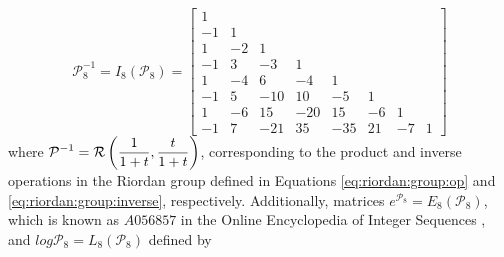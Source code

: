 \begin{example}
\begin{displaymath}
\mathcal{P}_{8}^{-1} = I_{8}\left( \mathcal{P}_{8}\right) = \left[\begin{matrix}1 &   &   &   &   &   &   &  \\-1 & 1 &   &   &   &   &   &  \\1 & -2 & 1 &   &   &   &   &  \\-1 & 3 & -3 & 1 &   &   &   &  \\1 & -4 & 6 & -4 & 1 &   &   &  \\-1 & 5 & -10 & 10 & -5 & 1 &   &  \\1 & -6 & 15 & -20 & 15 & -6 & 1 &  \\-1 & 7 & -21 & 35 & -35 & 21 & -7 & 1\end{matrix}\right]
\end{displaymath}
where $\displaystyle\mathcal{P}^{-1} = \mbox{$\mathcal{R}$}\left(\frac{1}{1+t},\frac{t}{1+t}
\right)$, corresponding to the product and inverse operations in the Riordan group
defined in Equations \ref {eq:riordan:group:op} and
\ref{eq:riordan:group:inverse}, respectively. Additionally, matrices
$e^{\mathcal{P}_{8}}= E_{8}\left( \mathcal{P}_{8}\right) $, which is known as
$A056857$ in the Online Encyclopedia of Integer Sequences \citep{OEIS}, and
$log{\mathcal{P}_{8}}= L_{8}\left( \mathcal{P}_{8}\right) $ defined by
\begin{displaymath}

\end{displaymath}
\end{example}
